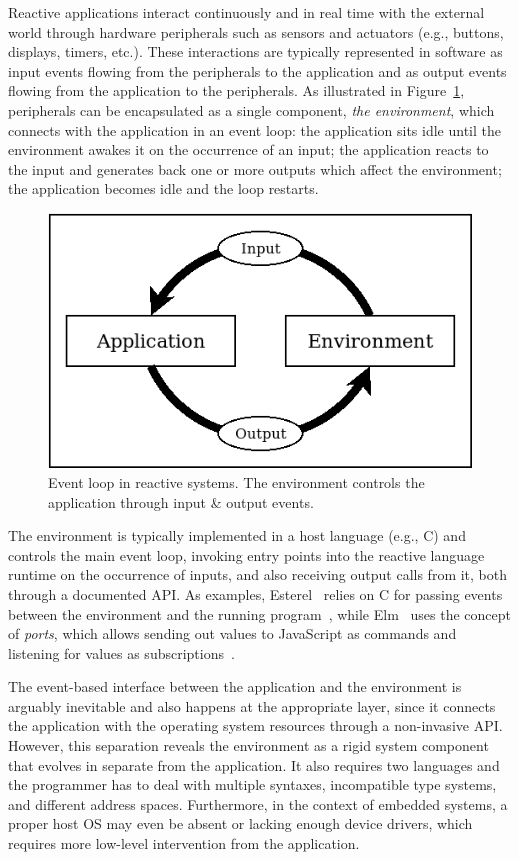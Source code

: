 \documentclass[sigplan,10pt,review,anonymous]{acmart}\settopmatter{printfolios=true,printccs=false,printacmref=false}
\begin{document}
Reactive applications interact continuously and in real time with the external
world through hardware peripherals such as sensors and actuators (e.g.,
buttons, displays, timers, etc.).
%
These interactions are typically represented in software as input events
flowing from the peripherals to the application and as output events flowing
from the application to the peripherals.
%
As illustrated in Figure~\ref{fig.env}, peripherals can be encapsulated as a
single component, \emph{the environment}, which connects with the application
in an event loop:
the application sits idle until the environment awakes it on the occurrence of
an input;
the application reacts to the input and generates back one or more outputs
which affect the environment;
the application becomes idle and the loop restarts.

\begin{figure}
\centering
\includegraphics[width=\linewidth]{loop}
\caption{ Event loop in reactive systems.
          The environment controls the application through input \& output
          events.
\label{fig.env}
}
\end{figure}

The environment is typically implemented in a host language (e.g., C) and
controls the main event loop, invoking entry points into the reactive language
runtime on the occurrence of inputs, and also receiving output calls from it,
both through a documented API.
%
As examples, Esterel~\cite{esterel.ieee91} relies on C for passing events
between the environment and the running program~\cite{esterel.book.compiling},
while Elm~\cite{frp.elm} uses the concept of \emph{ports}, which allows sending
out values to JavaScript as commands and listening for values as
subscriptions~\cite{frp.elm.ports}.

The event-based interface between the application and the environment is
arguably inevitable and also happens at the appropriate layer, since it
connects the application with the operating system resources through a
non-invasive API.
%
However, this separation reveals the environment as a rigid system component
that evolves in separate from the application.
%
It also requires two languages and the programmer has to deal with multiple
syntaxes, incompatible type systems, and different address spaces.
%
Furthermore, in the context of embedded systems, a proper host OS may even be
absent or lacking enough device drivers, which requires more low-level
intervention from the application.
\end{document}
